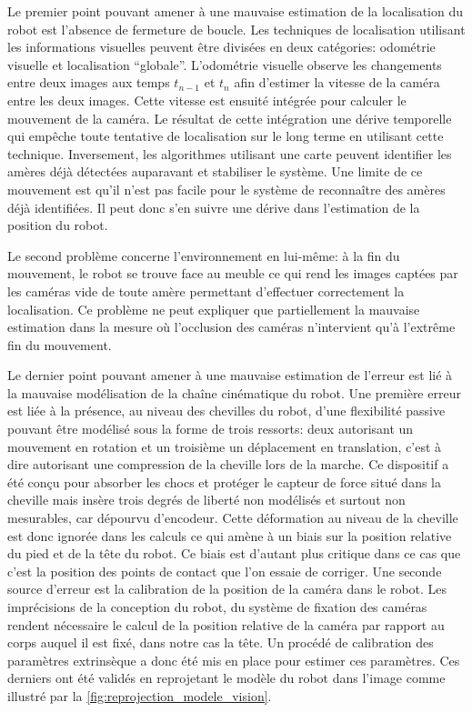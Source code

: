 Le premier point pouvant amener à une mauvaise estimation de la
localisation du robot est l'absence de fermeture de boucle. Les
techniques de localisation utilisant les informations visuelles
peuvent être divisées en deux catégories: odométrie visuelle et
localisation ``globale''. L'odométrie visuelle observe les changements
entre deux images aux temps $t_{n-1}$ et $t_n$ afin d'estimer la
vitesse de la caméra entre les deux images. Cette vitesse est ensuité
intégrée pour calculer le mouvement de la caméra. Le résultat de cette
intégration une dérive temporelle qui empêche toute tentative de
localisation sur le long terme en utilisant cette
technique. Inversement, les algorithmes utilisant une carte peuvent
identifier les amères déjà détectées auparavant et stabiliser le
système. Une limite de ce mouvement est qu'il n'est pas facile pour le
système de reconnaître des amères déjà identifiées. Il peut donc s'en
suivre une dérive dans l'estimation de la position du robot.


Le second problème concerne l'environnement en lui-même: à la fin du
mouvement, le robot se trouve face au meuble ce qui rend les images
captées par les caméras vide de toute amère permettant d'effectuer
correctement la localisation. Ce problème ne peut expliquer que
partiellement la mauvaise estimation dans la mesure où l'occlusion des
caméras n'intervient qu'à l'extrême fin du mouvement.


Le dernier point pouvant amener à une mauvaise estimation de l'erreur
est lié à la mauvaise modélisation de la chaîne cinématique du
robot. Une première erreur est liée à la présence, au niveau des
chevilles du robot, d'une flexibilité passive pouvant être modélisé
sous la forme de trois ressorts: deux autorisant un mouvement en
rotation et un troisième un déplacement en translation, c'est à dire
autorisant une compression de la cheville lors de la marche. Ce
dispositif a été conçu pour absorber les chocs et protéger le capteur
de force situé dans la cheville mais insère trois degrés de liberté
non modélisés et surtout non mesurables, car dépourvu
d'encodeur. Cette déformation au niveau de la cheville est donc
ignorée dans les calculs ce qui amène à un biais sur la position
relative du pied et de la tête du robot. Ce biais est d'autant plus
critique dans ce cas que c'est la position des points de contact que
l'on essaie de corriger. Une seconde source d'erreur est la
calibration de la position de la caméra dans le robot. Les
imprécisions de la conception du robot, du système de fixation des
caméras rendent nécessaire le calcul de la position relative de la
caméra par rapport au corps auquel il est fixé, dans notre cas la
tête. Un procédé de calibration des paramètres extrinsèque a donc été
mis en place pour estimer ces paramètres. Ces derniers ont été validés
en reprojetant le modèle du robot dans l'image comme illustré par la
\autoref{fig:reprojection_modele_vision}.


